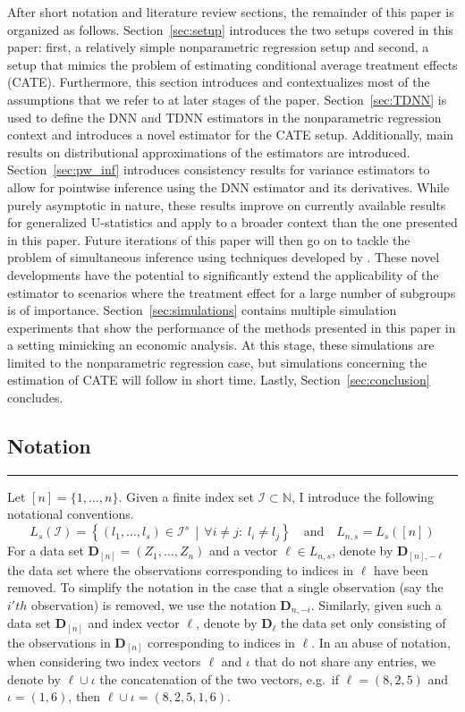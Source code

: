 After short notation and literature review sections, the remainder of this paper is organized as follows.
Section~\ref{sec:setup} introduces the two setups covered in this paper: first, a relatively simple nonparametric regression setup and second, a setup that mimics the problem of estimating conditional average treatment effects (CATE).
Furthermore, this section introduces and contextualizes most of the assumptions that we refer to at later stages of the paper.
Section~\ref{sec:TDNN} is used to define the DNN and TDNN estimators in the nonparametric regression context and introduces a novel estimator for the CATE setup.
Additionally, main results on distributional approximations of the estimators are introduced.
Section~\ref{sec:pw_inf} introduces consistency results for variance estimators to allow for pointwise inference using the DNN estimator and its derivatives.
While purely asymptotic in nature, these results improve on currently available results for generalized U-statistics and apply to a broader context than the one presented in this paper.
Future iterations of this paper will then go on to tackle the problem of simultaneous inference using techniques developed by \citet{ritzwoller_simultaneous_2024}.
These novel developments have the potential to significantly extend the applicability of the estimator to scenarios where the treatment effect for a large number of subgroups is of importance.
Section~\ref{sec:simulations} contains multiple simulation experiments that show the performance of the methods presented in this paper in a setting mimicking an economic analysis.
At this stage, these simulations are limited to the nonparametric regression case, but simulations concerning the estimation of CATE will follow in short time.
Lastly, Section~\ref{sec:conclusion} concludes.

\subsection{Notation}
\hrule
Let $[n] = \{1, \dotsc, n\}$.
Given a finite index set $\mathcal{I} \subset \mathbb{N}$, I introduce the following notational conventions.
\begin{equation}
	L_{s}(\mathcal{I}) = \left\{\left(l_1, \dotsc, l_s\right) \in \mathcal{I}^{s} \, \middle| \, \forall i \neq j: \; l_i \neq l_j\right\}
	\quad \text{and} \quad
	L_{n,s} = L_s\left([n]\right)
\end{equation}
For a data set $\mathbf{D}_{[n]} = \left(Z_1, \dotsc, Z_{n}\right)$ and a vector $\ell \in L_{n,s}$, denote by $\mathbf{D}_{[n], -\ell}$ the data set where the observations corresponding to indices in $\ell$ have been removed.
To simplify the notation in the case that a single observation (say the $i'th$ observation) is removed, we use the notation $\mathbf{D}_{n, -i}$.
Similarly, given such a data set $\mathbf{D}_{[n]}$ and index vector $\ell$, denote by $\mathbf{D}_{\ell}$ the data set only consisting of the observations in $\mathbf{D}_{[n]}$ corresponding to indices in $\ell$.
In an abuse of notation, when considering two index vectors $\ell$ and $\iota$ that do not share any entries, we denote by $\ell \cup \iota$ the concatenation of the two vectors, e.g.\ if $\ell = (8,2,5)$ and $\iota = (1,6)$, then $\ell \cup \iota = (8,2,5,1,6)$.

